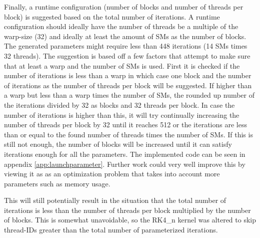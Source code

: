 Finally, a runtime configuration (number of blocks and number of threads per block) is suggested based on the total number of iterations.
A runtime configuration should ideally have the number of threads be a multiple of the warp-size (32) and ideally at least the amount of SMs as the number of blocks.
The generated parameters might require less than 448 iterations (14 SMs times 32 threads).
The suggestion is based off a few factors that attempt to make sure that at least a warp and the number of SMs is used.
First it is checked if the number of iterations is less than a warp in which case one block and the number of iterations as the number of threads per block will be suggested.
If higher than a warp but less than a warp times the number of SMs, the rounded up number of the iterations divided by 32 as blocks and 32 threads per block.
In case the number of iterations is higher than this, it will try continually increasing the number of threads per block by 32 until it reaches 512 or the iterations are less than or equal to the found number of threads times the number of SMs.
If this is still not enough, the number of blocks will be increased until it can satisfy iterations enough for all the parameters.
The implemented code can be seen in appendix \ref{app:launchparameter}.
Further work could very well improve this by viewing it as as an optimization problem that takes into account more parameters such as memory usage.

This will still potentially result in the situation that the total number of iterations is less than the number of threads per block multiplied by the number of blocks.
This is somewhat unavoidable, so the RK4\_n kernel was altered to skip thread-IDs greater than the total number of parameterized iterations.
